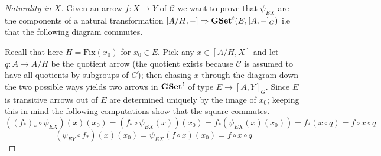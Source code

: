 \documentclass[italian, 12pt, reqno]{article}
\theoremstyle{myteo}
\numberwithin{equation}{section}
\newcommand{\cat}[1]{\mathscr{#1}}
\newcommand{\tgset}{\text{\textbf{GSet}}^t}
\newcommand{\fix}[1]{\text{Fix}(#1)}
\newcommand{\homs}[2]{[#1, #2]}
\newcommand{\fun}[3]{#1\colon#2\to #3}
\begin{document}
\begin{proof}[Naturality in \(X\)]
  \label{proof:naturality_in_X}
  Given an arrow \(\fun{f}{X}{Y}\) of \(\cat{C}\) we want to prove that \(\psi_{EX}\) are the components of a natural transformation \(\homs{A/H}{-}\Rightarrow \tgset(E, \homs{A}{-}_G)\) i.e that the following diagram commutes.
  \begin{center}
  \end{center}
  Recall that here \(H = \fix{x_0}\) for \(x_0\in E\).
  Pick any \(x\in \homs{A/H}{X}\) and let \(\fun{q}{A}{A/H}\) be the quotient arrow (the quotient exists because \(\cat{C}\) is assumed to have all quotients by subgroups of \(G\)); then chasing \(x\) through the diagram down the two possible ways yields two arrows in \(\tgset\) of type \(E\to\homs{A}{Y}_G\).
  Since \(E\) is transitive arrows out of \(E\) are determined uniquely by the image of \(x_0\); keeping this in mind the following computations show that the square commutes.
  \[((f_*)_*\circ \psi_{EX})(x)(x_0) = (f_*\circ \psi_{EX}(x))(x_0) = f_*(\psi_{EX}(x)(x_0)) = f_*(x\circ q) = f\circ x\circ q\]
  \[(\psi_{EY}\circ f_*)(x)(x_0) = \psi_{EX}(f\circ x)(x_0) = f\circ x\circ q\]
\end{proof}
\end{document}
